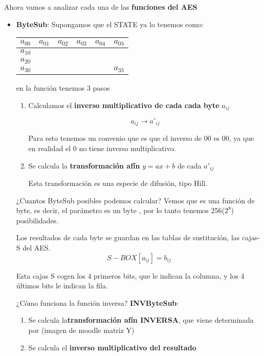 Ahora vamos a analizar cada una de las \textbf{funciones del AES}
\begin{itemize}
	\item \textbf{ByteSub}:
	Supongamos que el STATE ya lo tenemos como:
	
	\begin{center}
		
		\begin{tabular}{l | c | r | r | r | r}
			$a_{00}$ & $a_{01}$ & $a_{02}$ & $a_{03}$ & $a_{04}$ & $a_{05}$\\
			\hline
			$a_{10}$ &   &   &   &   &  \\
			\hline
			$a_{20}$ &   &   &   &   &  \\
			\hline
			$a_{30}$ &   &   &   &   & $a_{35}$
			
		\end{tabular}
	\end{center}
	
	en la función tenemos 3 pasos
	\begin{enumerate}
		\item Calculamos el \textbf{inverso multiplicativo de cada cada byte} $a_{ij}$
		
		$$a_{ij} \rightarrow a'_{ij}$$
		
		Para esto tenemos un convenio que es que el inverso de $00$ es $00$, ya que en realidad el 0 no tiene inverso multiplicativo.
		
		\item Se calcula la \textbf{transformación afín} $y = ax +b$ de cada $a'_{ij}$
		
		Esta transformación es una especie de difusión, tipo Hill.
	\end{enumerate}
	
	¿Cuantos ByteSub posibles podemos calcular? Vemos que es una función de byte, es decir, el parámetro es un byte , por lo tanto tenemos 256($2^8$) posibilidades.
	
	Los resultados de cada byte se guardan en las tablas de sustitución, las cajas-S del AES.
	$$S-BOX[a_{ij}] = b_{ij}$$
	
	Esta cajas S cogen los 4 primeros bits, que le indican la columna, y los 4 últimos bits le indican la fila.
	
	¿Cómo funciona la función inversa? \textbf{INVByteSub}:
	\begin{enumerate}
		\item Se calcula la\textbf{transformación afín INVERSA}, que viene determinada por (imagen de moodle matriz Y)
		\item Se calcula el \textbf{inverso multiplicativo del resultado}
	\end{enumerate}
	

\end{itemize}
